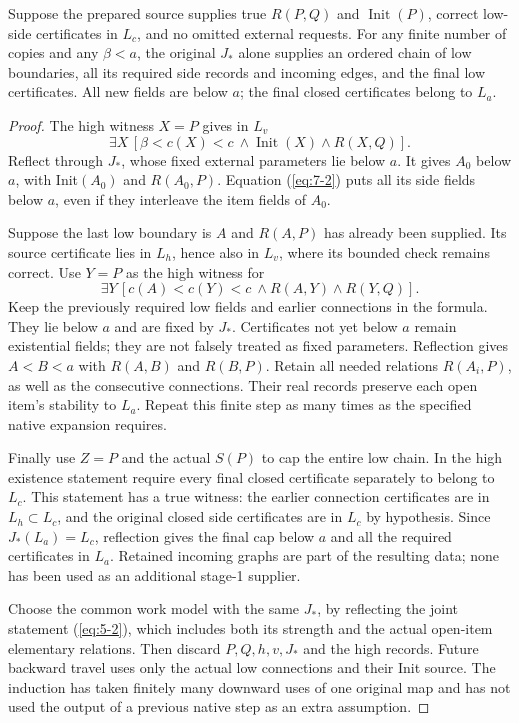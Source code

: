 \begin{lemma}\label{lem:connection}
Suppose the prepared source supplies true $R(P,Q)$ and
$\operatorname{Init}(P)$, correct low-side certificates in $L_c$, and
no omitted external requests. For any finite number of copies and any
$\beta<a$, the original $J_*$ alone supplies an ordered chain of low
boundaries, all its required side records and incoming edges, and the
final low certificates. All new fields are below $a$; the final closed
certificates belong to $L_a$.
\end{lemma}
\begin{proof}
The high witness $X=P$ gives in $L_v$
\begin{equation}\label{eq:7-3}
 \exists X\,[\beta<c(X)<c\ \wedge\operatorname{Init}(X)
                                      \wedge R(X,Q)].           
\end{equation}
Reflect through $J_*$, whose fixed external parameters lie below $a$.
It gives $A_0$ below $a$, with Init$(A_0)$ and $R(A_0,P)$. Equation
(\ref{eq:7-2}) puts all its side fields below $a$, even if they interleave
the item fields of $A_0$.

Suppose the last low boundary is $A$ and $R(A,P)$ has already been
supplied. Its source certificate lies in $L_h$, hence also in $L_v$,
where its bounded check remains correct. Use $Y=P$ as the high witness
for
\begin{equation}\label{eq:7-4}
 \exists Y\,[c(A)<c(Y)<c\ \wedge R(A,Y)\wedge R(Y,Q)].       
\end{equation}
Keep the previously required low fields and earlier connections in
the formula. They lie below $a$ and are fixed by $J_*$. Certificates
not yet below $a$ remain existential fields; they are not falsely
treated as fixed parameters. Reflection gives $A<B<a$ with $R(A,B)$
and $R(B,P)$. Retain all needed relations $R(A_i,P)$, as well as the
consecutive connections. Their real records preserve each open item's
stability to $L_a$. Repeat this finite step as many times as the
specified native expansion requires.

Finally use $Z=P$ and the actual $S(P)$ to cap the entire low chain.
In the high existence statement require every final closed certificate
separately to belong to $L_c$. This statement has a true witness:
the earlier connection certificates are in $L_h\subset L_c$, and the
original closed side certificates are in $L_c$ by hypothesis.
Since $J_*(L_a)=L_c$, reflection gives the final cap below $a$ and
all the required certificates in $L_a$. Retained incoming graphs are
part of the resulting data; none has been used as an additional
stage-1 supplier.

Choose the common work model with the same $J_*$, by reflecting the
joint statement (\ref{eq:5-2}), which includes both its strength and the actual
open-item elementary relations. Then discard $P,Q,h,v,J_*$ and the
high records. Future backward travel uses only the actual low
connections and their Init source. The induction has taken finitely
many downward uses of one original map and has not used the output
of a previous native step as an extra assumption.
\end{proof}

